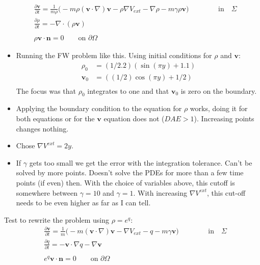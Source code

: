 \documentclass[11pt, a4paper]{article}
\theoremstyle{definition}
\newcommand{\Sta}{\rho}
\newcommand{\Stav}{\mathbf{v}}
\begin{document}
\begin{align*}
& \frac{\partial \Stav}{\partial t} = \frac{1}{m \Sta}\bigg(- m \Sta (\Stav \cdot \nabla)\Stav - \Sta \nabla V_{ext} - \nabla \Sta - m \gamma \Sta \Stav\bigg) \ \ \ \qquad \ \ \quad\text{in} \quad \Sigma\\
&\frac{\partial \Sta}{\partial t} = - \nabla \cdot (\Sta \Stav)\\
\\
&\Sta \Stav \cdot \mathbf{n} =0	\qquad\text{on } \partial \Omega
\end{align*}
\begin{itemize}
	\item Running the FW problem like this. Using initial conditions for $\rho$ and $\mathbf{v}$:
	\begin{align*}
	\rho_0 &= (1/2.2)(\sin(\pi y) + 1.1)\\
	\Stav_0 &= ((1/2)\cos(\pi y) + 1/2)\\
	\end{align*}
	The focus was that $\rho_0$ integrates to one and that $\Stav_0$ is zero on the boundary. 
	\item Applying the boundary condition to the equation for $\Sta$ works, doing it for both equations or for the $\Stav$ equation does not ($DAE >1$). Increasing points changes nothing.
	\item Chose $\nabla V^{ext} = 2 y $.
	\item If $\gamma$ gets too small we get the error with the integration tolerance. Can't be solved by more points. Doesn't solve the PDEs for more than a few time points (if even) then. With the choice of variables above, this cutoff is somewhere between $\gamma = 10$ and $\gamma = 1$. With increasing $\nabla V^{ext}$, this cut-off needs to be even higher as far as I can tell.
\end{itemize}

Test to rewrite the problem using $\rho = e^q$:
\begin{align*}
& \frac{\partial \Stav}{\partial t} = \frac{1}{m }\bigg(- m (\Stav \cdot \nabla)\Stav - \nabla V_{ext} - q - m \gamma \Stav\bigg) \ \ \ \qquad \ \ \quad\text{in} \quad \Sigma\\
&\frac{\partial q}{\partial t} = - \Stav \cdot\nabla q - \nabla \Stav\\
\\
&e^q \Stav \cdot \mathbf{n} =0	\qquad\text{on } \partial \Omega
\end{align*}
\end{document}

